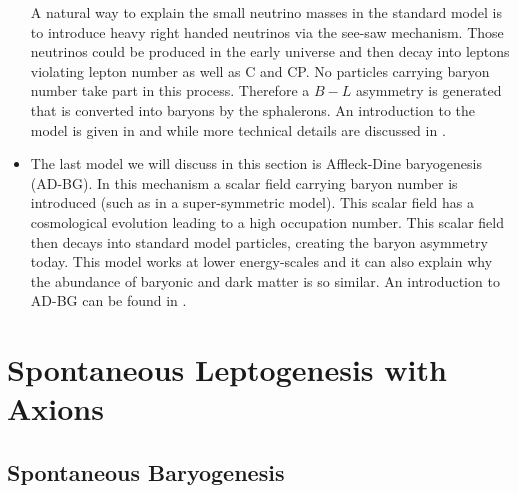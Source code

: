 \documentclass[13pt,a4paper,twoside,titlepage]{article}
\begin{document}
\begin{itemize}
    A natural way to explain the small neutrino masses in the standard model is to introduce heavy right handed neutrinos via the see-saw mechanism.
    Those neutrinos could be produced in the early universe and then decay into leptons violating lepton number as well as C and CP. No particles carrying baryon
    number take part in this process.
    Therefore a $B - L$ asymmetry is generated that is converted into baryons by the sphalerons. An introduction to the model is given in \cite{Leptogenesis_review_doi:10.1146/annurev.nucl.55.090704.151558} and \cite{Leptogenesis_Buchmüller:2014} while more technical details are discussed in \cite{Pedestrians_Buchm_ller_2005}.
    \item The last model we will discuss in this section is Affleck-Dine baryogenesis (AD-BG).
    In this mechanism a scalar field carrying baryon number is introduced (such as in a super-symmetric model).
    This scalar field has a cosmological evolution leading to a high occupation number. This scalar field then decays into standard model particles, creating the baryon asymmetry today.
    This model works at lower energy-scales and it can also explain why the abundance of baryonic and dark matter is so similar. An introduction to AD-BG can be found in \cite[Part III]{Dine_2003_Bayrogenesis}.
\end{itemize}


\section{Spontaneous Leptogenesis with Axions}

\subsection{Spontaneous Baryogenesis}
\label{sec:spontaneour_bayrogenesis}
\end{document}
